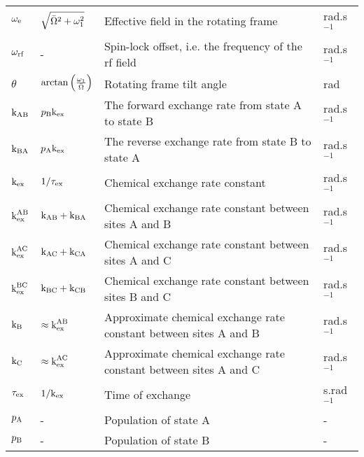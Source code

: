 \begin{landscape}
\begin{center}
\begin{small}
\begin{longtable}{llll}
$\omega_\textrm{e}$          & $\sqrt{\bar\Omega^2 + \omega_1^2}$  & Effective field in the rotating frame                                   & rad.s$^{-1}$ \\
$\omega_\textrm{rf}$         & -                              & Spin-lock offset, i.e. the frequency of the rf field                          & rad.s$^{-1}$ \\
$\theta$           & $\arctan \left( \frac{\omega_1}{\bar\Omega} \right)$  & Rotating frame tilt angle                             & rad \\
$\textrm{k}_\textrm{AB}$             & $p_\textrm{B}\textrm{k}_\textrm{ex}$                      & The forward exchange rate from state A to state B                             & rad.s$^{-1}$ \\
$\textrm{k}_\textrm{BA}$             & $p_\textrm{A}\textrm{k}_\textrm{ex}$                      & The reverse exchange rate from state B to state A                             & rad.s$^{-1}$ \\
$\textrm{k}_\textrm{ex}$             & $1 / \tau_\textrm{ex}$                     & Chemical exchange rate constant                                               & rad.s$^{-1}$ \\
$\textrm{k}_\textrm{ex}^\textrm{AB}$           & $\textrm{k}_\textrm{AB} + \textrm{k}_\textrm{BA}$                  & Chemical exchange rate constant between sites A and B                         & rad.s$^{-1}$ \\
$\textrm{k}_\textrm{ex}^\textrm{AC}$           & $\textrm{k}_\textrm{AC} + \textrm{k}_\textrm{CA}$                  & Chemical exchange rate constant between sites A and C                         & rad.s$^{-1}$ \\
$\textrm{k}_\textrm{ex}^\textrm{BC}$           & $\textrm{k}_\textrm{BC} + \textrm{k}_\textrm{CB}$                  & Chemical exchange rate constant between sites B and C                         & rad.s$^{-1}$ \\
$\textrm{k}_\textrm{B}$              & $\approx \textrm{k}_\textrm{ex}^\textrm{AB}$               & Approximate chemical exchange rate constant between sites A and B             & rad.s$^{-1}$ \\
$\textrm{k}_\textrm{C}$              & $\approx \textrm{k}_\textrm{ex}^\textrm{AC}$               & Approximate chemical exchange rate constant between sites A and C             & rad.s$^{-1}$ \\
$\tau_\textrm{ex}$             & $1 / \textrm{k}_\textrm{ex}$                     & Time of exchange                                                              & s.rad$^{-1}$ \\
$p_\textrm{A}$              & -                              & Population of state A                                                         & - \\
$p_\textrm{B}$              & -                              & Population of state B                                                         & - \\

\end{longtable}
\end{small}
\end{center}
\end{landscape}
